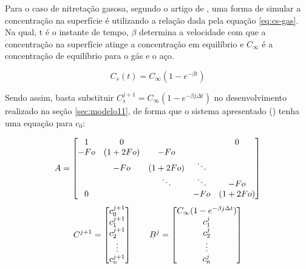 Para o caso de nitretação gasosa, segundo o artigo de \cite{christiansen2008nitrogen}, uma forma de simular a concentração na superfície é utilizando a relação dada pela equação \autoref{eq:cs-gas}. Na qual, t é o instante de tempo, $\beta$ determina a velocidade com que a concentração na superfície atinge a concentração em equilíbrio e $C_{\infty}$ é a concentração de equilíbrio para o gás e o aço.

\begin{equation}
\label{eq:cs-gas}
C_{s}(t) = C_{\infty}(1 - e^{-\beta t})
\end{equation}

Sendo assim, basta substituir $C_s^{j+1} = C_{\infty}(1 - e^{-\beta j\Delta t})$ no desenvolvimento realizado na seção \autoref{sec:modelo11}, de forma que o sistema apresentado () tenha uma equação para $c_0$:

\begin{equation*}
	\cmrtext{A} =
	\begin{bmatrix}
		  1 & 0 &         &        & 0\\
		-Fo & (1+2Fo) &  -Fo   &        & \\
		    & -Fo &   (1+2Fo)   & \ddots & \\
		    &     &  \ddots & \ddots & -Fo \\
	     0  &     &         &  -Fo   & (1+2Fo) 
	\end{bmatrix}
\end{equation*}
\begin{equation*}
	\cmrtext{C^{j+1}} =
	\begin{bmatrix}
		c_0^{j+1} \\
		c_1^{j+1} \\
		c_2^{j+1} \\
		\vdots \\
		c_n^{j+1}
	\end{bmatrix}
	\qquad
	\cmrtext{B^j} =	
	\begin{bmatrix}
		C_{\infty}(1 - e^{-\beta j\Delta t}) \\
		c_1^j \\
		c_2^{j} \\
		\vdots \\
		c_n^{j}
	\end{bmatrix}
\end{equation*}


